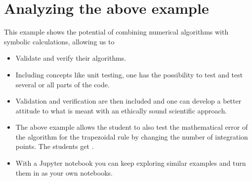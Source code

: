 \documentclass[letterpaper,10pt,english]{sphinxmanual}
\begin{document}
\begin{sphinxVerbatim}[commandchars=\\\{\}]
      
      
      
    \PYG{p}{[}\PYG{p}{]}   \PYG{p}{[}\PYG{p}{]}  
 
\end{sphinxVerbatim}

\noindent{}


\chapter{Analyzing the above example}
\label{\detokenize{chapter1:analyzing-the-above-example}}
This example shows the potential of combining numerical algorithms with symbolic calculations, allowing us to
\begin{itemize}
\item {} 
Validate and verify  their  algorithms.

\item {} 
Including concepts like unit testing, one has the possibility to test and test several or all parts of the code.

\item {} 
Validation and verification are then included  and one can develop a better attitude to what is meant with an ethically sound scientific approach.

\item {} 
The above example allows the student to also test the mathematical error of the algorithm for the trapezoidal rule by changing the number of integration points. The students get .

\item {} 
With a Jupyter notebook you can keep exploring similar examples and turn them in as your own notebooks.

\end{itemize}
\end{document}
